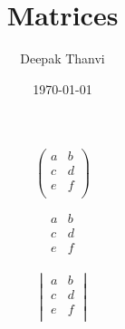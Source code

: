 \documentclass{article}
\title{Matrices}
\author{Deepak Thanvi}
\date{\today}
\begin{document}
\maketitle

\[
     \begin{pmatrix}
     	a & b \\
     	c & d \\
     	e & f \\
     \end{pmatrix}
\]

\[
     \begin{matrix}
        a & b \\
     	c & d \\
     	e & f \\
     \end{matrix}
\]

\[
     \begin{vmatrix}
        a & b \\
     	c & d \\
     	e & f \\
     \end{vmatrix}
\]
\end{document}
